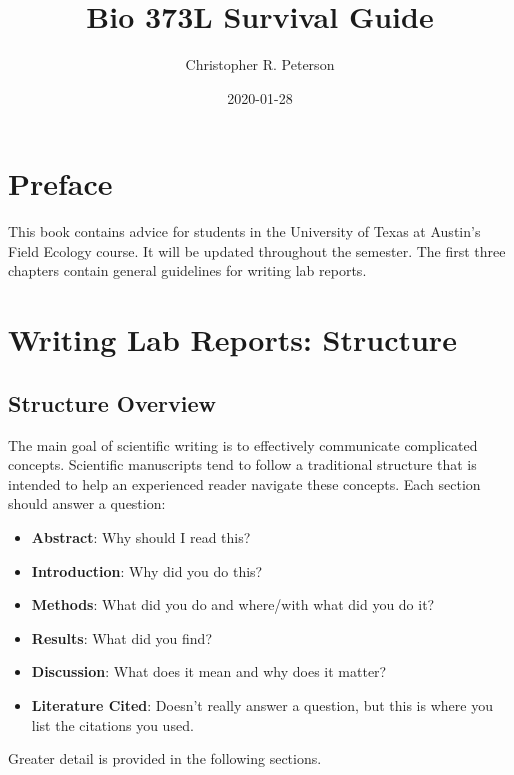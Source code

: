 \documentclass[]{book}
\title{Bio 373L Survival Guide}
\author{Christopher R. Peterson}
\date{2020-01-28}
\providecommand{\tightlist}{%
  \setlength{\itemsep}{0pt}\setlength{\parskip}{0pt}}
\begin{document}
\maketitle

{
\setcounter{tocdepth}{1}
\tableofcontents
}
\chapter*{Preface}\label{preface}

This book contains advice for students in the University of Texas at
Austin's Field Ecology course. It will be updated throughout the
semester. The first three chapters contain general guidelines for
writing lab reports.

\chapter{Writing Lab Reports: Structure}\label{structure}

\section{Structure Overview}\label{structure-overview}

The main goal of scientific writing is to effectively communicate
complicated concepts. Scientific manuscripts tend to follow a
traditional structure that is intended to help an experienced reader
navigate these concepts. Each section should answer a question:

\begin{itemize}
\tightlist
\item
  \textbf{Abstract}: Why should I read this?
\item
  \textbf{Introduction}: Why did you do this?\\
\item
  \textbf{Methods}: What did you do and where/with what did you do it?
\item
  \textbf{Results}: What did you find?\\
\item
  \textbf{Discussion}: What does it mean and why does it matter?
\item
  \textbf{Literature Cited}: Doesn't really answer a question, but this
  is where you list the citations you used.
\end{itemize}

Greater detail is provided in the following sections.
\end{document}
